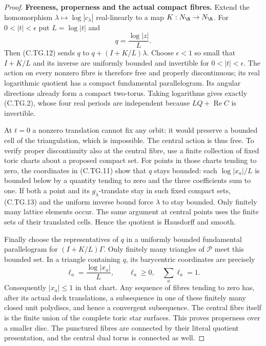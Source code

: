 \begin{proof}
\par\medskip\noindent\textbf{Freeness, properness and the actual compact fibres.}
Extend the homomorphism
$\lambda\mapsto\log|c_\lambda|$ real-linearly
to a map $K:N_{\R}\to N_{\R}$.
For $0<|t|<\epsilon$ put $L=\log|t|$ and
\[
                 q=\frac{\log|z|}{L}.
\tag{C.TG.13}
\]
Then (C.TG.12) sends $q$ to
$q+(I+K/L)\lambda$.
Choose $\epsilon<1$ so small that $I+K/L$
and its inverse are uniformly bounded and
invertible for $0<|t|<\epsilon$.
The action on every nonzero fibre is
therefore free and properly discontinuous;
its real logarithmic quotient has a compact
fundamental parallelogram. Its angular
directions already form a compact two-torus.
Taking logarithms gives exactly (C.TG.2),
whose four real periods are independent
because $LQ+\operatorname{Re}C$ is invertible.

At $t=0$ a nonzero translation cannot fix
any orbit: it would preserve a bounded cell
of the triangulation, which is impossible.
The central action is thus free. To verify
proper discontinuity also at the central
fibre, use a finite collection of fixed
toric charts about a proposed compact set.
For points in those charts tending to zero,
the coordinates in (C.TG.11) show that $q$
stays bounded: each $\log|x_a|/L$ is bounded
below by a quantity tending to zero and
the three coefficients sum to one.
If both a point and its $g_\lambda$-translate
stay in such fixed compact sets, (C.TG.13)
and the uniform inverse bound force
$\lambda$ to stay bounded. Only finitely
many lattice elements occur. The same
argument at central points uses the finite
sets of their translated cells. Hence the
quotient is Hausdorff and smooth.

Finally choose the representatives of $q$
in a uniformly bounded fundamental
parallelogram for $(I+K/L)\Gamma$.
Only finitely many triangles of
$\mathscr P$ meet this bounded set.
In a triangle containing $q$, its
barycentric coordinates are precisely
\[
             \ell_a=\frac{\log|x_a|}{L},
             \qquad \ell_a\ge0,\quad\sum_a\ell_a=1.
\tag{C.TG.14}
\]
Consequently $|x_a|\le1$ in that chart.
Any sequence of fibres tending to zero
has, after its actual deck translations,
a subsequence in one of these finitely
many closed unit polydiscs, and hence a
convergent subsequence. The central fibre
itself is the finite union of the complete
toric star surfaces. This proves properness
over a smaller disc. The punctured fibres
are connected by their literal quotient
presentation, and the central dual torus
is connected as well.


\end{proof}
